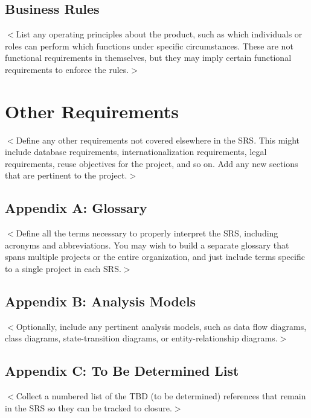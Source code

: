 \documentclass{scrreprt}
\begin{document}
\section{Business Rules}
$<$List any operating principles about the product, such as which individuals or
roles can perform which functions under specific circumstances. These are not
functional requirements in themselves, but they may imply certain functional
requirements to enforce the rules.$>$


\chapter{Other Requirements}
$<$Define any other requirements not covered elsewhere in the SRS. This might
include database requirements, internationalization requirements, legal
requirements, reuse objectives for the project, and so on. Add any new sections
that are pertinent to the project.$>$

\section{Appendix A: Glossary}
$<$Define all the terms necessary to properly interpret the SRS, including
acronyms and abbreviations. You may wish to build a separate glossary that spans
multiple projects or the entire organization, and just include terms specific to
a single project in each SRS.$>$

\section{Appendix B: Analysis Models}
$<$Optionally, include any pertinent analysis models, such as data flow
diagrams, class diagrams, state-transition diagrams, or entity-relationship
diagrams.$>$

\section{Appendix C: To Be Determined List}
$<$Collect a numbered list of the TBD (to be determined) references that remain
in the SRS so they can be tracked to closure.$>$
\end{document}

